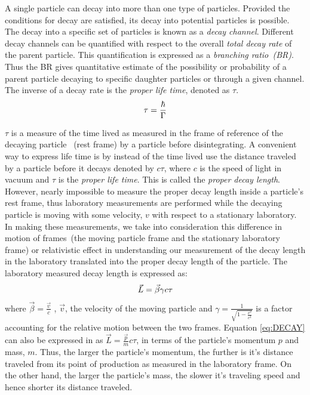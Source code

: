{A single particle can decay into more than one type of particles. Provided the conditions for decay are satisfied, its decay into potential particles is possible. The decay into a specific set of particles is known as a \textit{decay channel}. Different decay channels can be quantified with respect to the overall \textit{total decay rate}  of the parent particle. This quantification is expressed as a \textit{ branching ratio~(BR)}. Thus the BR gives quantitative estimate of the possibility or probability of a parent particle decaying to specific daughter particles or through a given channel.
\newline
The inverse of a decay rate is the \textit{proper life time}, denoted as $\tau$.
\begin{equation}{\label{eq:RATE}}
  \tau = \frac{\hbar}{\Gamma}
\end{equation}

$\tau$ is a measure of the time lived as measured in the frame of reference of the decaying particle ~(rest frame) by a particle before disintegrating.
 A convenient way to express life time is by instead of the time lived use the distance traveled by a particle before it decays denoted by  $c\tau$, where $c$ is the speed of light in vacuum and $\tau$ is the \textit{proper life time}.
This is called the \textit{proper decay length}. However, nearly impossible to measure the proper decay length inside a particle's rest frame, thus  laboratory measurements are  performed while the decaying particle is moving with some velocity, $v$ with respect to a stationary laboratory. In making these measurements,  we take into consideration this difference in motion of frames~(the moving particle frame and the stationary laboratory frame)  or relativistic effect in understanding our measurement of the decay length in the laboratory translated into the proper decay length of the particle. %
The laboratory measured decay length is expressed as:
\begin{equation}{\label{eq:DECAY}}
 \vec{L} = \vec{\beta} \gamma c\tau
\end{equation}
where $\vec{\beta} = \frac{\vec{v}}{c} $ , $\vec{v}$, the velocity of the moving particle and $\gamma = \frac{1}{\sqrt{1 - \frac{v^{2}}{c^{2}}}}$ is a factor accounting for the relative motion between the two frames.
Equation \ref{eq:DECAY} can also be expressed in as $\vec{L} = \frac{\vec{p}}{m}c\tau$, in terms of the particle's momentum $p$ and mass, $m$.
Thus, the larger the particle's momentum, the further is it's distance traveled from its point of production as measured in the laboratory frame. On the other hand, the larger the particle's mass, the slower it's traveling speed and hence shorter its distance traveled.

}
